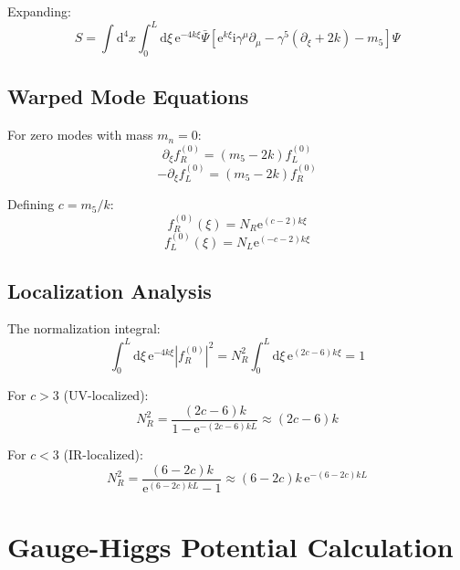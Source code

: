 \documentclass[11pt,a4paper]{article}
\newcommand{\dd}{\mathrm{d}}
\newcommand{\ii}{\mathrm{i}}
\newcommand{\ee}{\mathrm{e}}
\begin{document}
Expanding:
\begin{equation}
S = \int \dd^4x\int_0^L \dd\xi\, \ee^{-4k\xi}\bar{\Psi}
\left[\ee^{k\xi}\ii\gamma^\mu\partial_\mu - \gamma^5(\partial_\xi + 2k) - m_5\right]\Psi
\label{eq:warped-dirac-expanded}
\end{equation}

\subsection{Warped Mode Equations}

For zero modes with mass $m_n = 0$:
\begin{equation}
\partial_\xi f_R^{(0)} = (m_5 - 2k) f_L^{(0)}
\label{eq:warped-mode-1}
\end{equation}
\begin{equation}
-\partial_\xi f_L^{(0)} = (m_5 - 2k) f_R^{(0)}
\label{eq:warped-mode-2}
\end{equation}

Defining $c = m_5/k$:
\begin{equation}
f_R^{(0)}(\xi) = N_R \ee^{(c-2)k\xi}
\label{eq:warped-fR}
\end{equation}
\begin{equation}
f_L^{(0)}(\xi) = N_L \ee^{(-c-2)k\xi}
\label{eq:warped-fL}
\end{equation}

\subsection{Localization Analysis}

The normalization integral:
\begin{equation}
\int_0^L \dd\xi\, \ee^{-4k\xi}|f_R^{(0)}|^2 = N_R^2 \int_0^L \dd\xi\, \ee^{(2c-6)k\xi} = 1
\label{eq:warped-norm-integral}
\end{equation}

For $c > 3$ (UV-localized):
\begin{equation}
N_R^2 = \frac{(2c-6)k}{1 - \ee^{-(2c-6)kL}} \approx (2c-6)k
\label{eq:uv-localized}
\end{equation}

For $c < 3$ (IR-localized):
\begin{equation}
N_R^2 = \frac{(6-2c)k}{\ee^{(6-2c)kL} - 1} \approx (6-2c)k\, \ee^{-(6-2c)kL}
\label{eq:ir-localized}
\end{equation}

\section{Gauge-Higgs Potential Calculation}
\label{app:higgs-potential}
\end{document}

